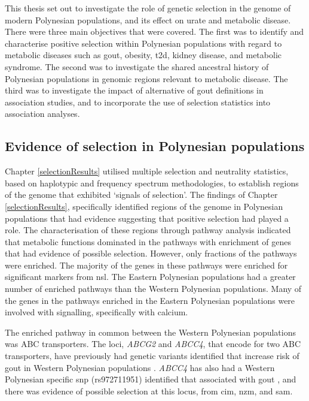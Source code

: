 \documentclass[]{report}
\begin{document}
This thesis set out to investigate the role of genetic selection in the
genome of modern Polynesian populations, and its effect on urate and
metabolic disease. There were three main objectives that were covered.
The first was to identify and characterise positive selection within
Polynesian populations with regard to metabolic diseases such as gout,
obesity, \gls{t2d}, kidney disease, and metabolic syndrome. The second
was to investigate the shared ancestral history of Polynesian
populations in genomic regions relevant to metabolic disease. The third
was to investigate the impact of alternative of gout definitions in
association studies, and to incorporate the use of selection statistics
into association analyses.

\subsection{Evidence of selection in Polynesian
populations}\label{evidence-of-selection-in-polynesian-populations}

Chapter \ref{selectionResults} utilised multiple selection and
neutrality statistics, based on haplotypic and frequency spectrum
methodologies, to establish regions of the genome that exhibited
`signals of selection'. The findings of Chapter \ref{selectionResults},
specifically identified regions of the genome in Polynesian populations
that had evidence suggesting that positive selection had played a role.
The characterisation of these regions through pathway analysis indicated
that metabolic functions dominated in the pathways with enrichment of
genes that had evidence of possible selection. However, only fractions
of the pathways were enriched. The majority of the genes in these
pathways were enriched for significant markers from \gls{nsl}. The
Eastern Polynesian populations had a greater number of enriched pathways
than the Western Polynesian populations. Many of the genes in the
pathways enriched in the Eastern Polynesian populations were involved
with signalling, specifically with calcium.

The enriched pathway in common between the Western Polynesian
populations was ABC transporters. The loci, \emph{ABCG2} and
\emph{ABCC4}, that encode for two ABC transporters, have previously had
genetic variants identified that increase risk of gout in Western
Polynesian populations \citep{Phipps-Green2010, Tanner2017}.
\emph{ABCC4} has also had a Western Polynesian specific \gls{snp}
(rs972711951) identified that associated with gout \citep{Tanner2017},
and there was evidence of possible selection at this locus, from
\gls{cim}, \gls{nzm}, and \gls{sam}.
\end{document}
